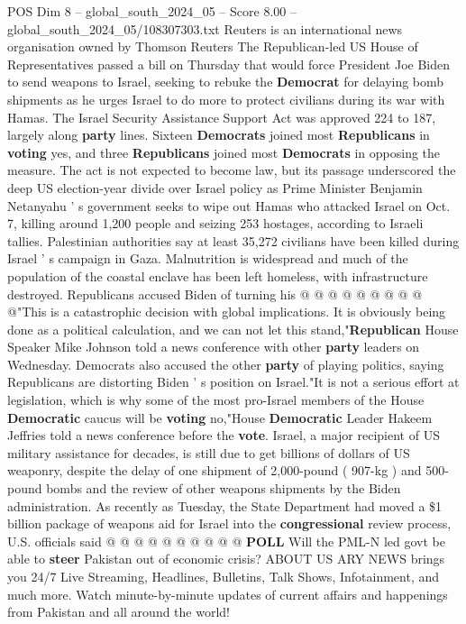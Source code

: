 \begin{textsample}{POS Dim 8 – global\_south\_2024\_05 – Score 8.00 – global\_south\_2024\_05/108307303.txt}  \label{ex:f8_pos_221}
Reuters is an international news organisation owned by Thomson Reuters The Republican-led US House of Representatives passed a bill on Thursday that would force President Joe Biden to send weapons to Israel, seeking to rebuke the \textbf{Democrat} for delaying bomb shipments as he urges Israel to do more to protect civilians during its war with Hamas.
The Israel Security Assistance Support Act was approved 224 to 187, largely along \textbf{party} lines.
Sixteen \textbf{Democrats} joined most \textbf{Republicans} in \textbf{voting} yes, and three \textbf{Republicans} joined most \textbf{Democrats} in opposing the measure.
The act is not expected to become law, but its passage underscored the deep US election-year divide over Israel policy as Prime Minister Benjamin Netanyahu ' s government seeks to wipe out Hamas who attacked Israel on Oct. 7, killing around 1,200 people and seizing 253 hostages, according to Israeli tallies.
Palestinian authorities say at least 35,272 civilians have been killed during Israel ' s campaign in Gaza.
Malnutrition is widespread and much of the population of the coastal enclave has been left homeless, with infrastructure destroyed.
Republicans accused Biden of turning his @ @ @ @ @ @ @ @ @ @"This is a catastrophic decision with global implications.
It is obviously being done as a political calculation, and we can not let this stand,"\textbf{Republican} House Speaker Mike Johnson told a news conference with other \textbf{party} leaders on Wednesday.
Democrats also accused the other \textbf{party} of playing politics, saying Republicans are distorting Biden ' s position on Israel."It is not a serious effort at legislation, which is why some of the most pro-Israel members of the House \textbf{Democratic} caucus will be \textbf{voting} no,"House \textbf{Democratic} Leader Hakeem Jeffries told a news conference before the \textbf{vote}.
Israel, a major recipient of US military assistance for decades, is still due to get billions of dollars of US weaponry, despite the delay of one shipment of 2,000-pound ( 907-kg ) and 500-pound bombs and the review of other weapons shipments by the Biden administration.
As recently as Tuesday, the State Department had moved a \$1 billion package of weapons aid for Israel into the \textbf{congressional} review process, U.S. officials said @ @ @ @ @ @ @ @ @ @ \textbf{POLL} Will the PML-N led govt be able to \textbf{steer} Pakistan out of economic crisis?
ABOUT US ARY NEWS brings you 24/7 Live Streaming, Headlines, Bulletins, Talk Shows, Infotainment, and much more.
Watch minute-by-minute updates of current affairs and happenings from Pakistan and all around the world!

\end{textsample}
